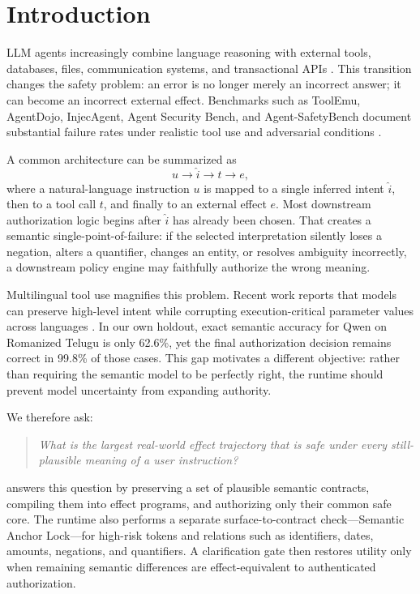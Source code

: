 \section{Introduction}

LLM agents increasingly combine language reasoning with external tools, databases, files, communication systems, and transactional APIs \cite{react2023,taubench2024}. This transition changes the safety problem: an error is no longer merely an incorrect answer; it can become an incorrect external effect. Benchmarks such as ToolEmu, AgentDojo, InjecAgent, Agent Security Bench, and Agent-SafetyBench document substantial failure rates under realistic tool use and adversarial conditions \cite{toolemu2024,agentdojo2024,injecagent2024,asb2025,agentsafetybench2024}.

A common architecture can be summarized as
\begin{equation}
  u \rightarrow \hat{i} \rightarrow t \rightarrow e,
\end{equation}
where a natural-language instruction $u$ is mapped to a single inferred intent $\hat{i}$, then to a tool call $t$, and finally to an external effect $e$. Most downstream authorization logic begins after $\hat{i}$ has already been chosen. That creates a semantic single-point-of-failure: if the selected interpretation silently loses a negation, alters a quantifier, changes an entity, or resolves ambiguity incorrectly, a downstream policy engine may faithfully authorize the wrong meaning.

Multilingual tool use magnifies this problem. Recent work reports that models can preserve high-level intent while corrupting execution-critical parameter values across languages \cite{lostexecution2026}. In our own holdout, exact semantic accuracy for Qwen on Romanized Telugu is only 62.6\%, yet the final authorization decision remains correct in 99.8\% of those cases. This gap motivates a different objective: rather than requiring the semantic model to be perfectly right, the runtime should prevent model uncertainty from expanding authority.

We therefore ask:
\begin{quote}
\emph{What is the largest real-world effect trajectory that is safe under every still-plausible meaning of a user instruction?}
\end{quote}

\system answers this question by preserving a set of plausible semantic contracts, compiling them into effect programs, and authorizing only their common safe core. The runtime also performs a separate surface-to-contract check---Semantic Anchor Lock---for high-risk tokens and relations such as identifiers, dates, amounts, negations, and quantifiers. A clarification gate then restores utility only when remaining semantic differences are effect-equivalent to authenticated authorization.

